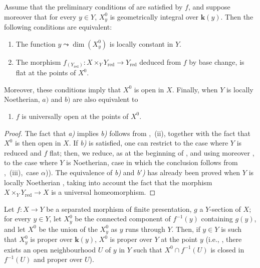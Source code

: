 \begin{corollary}[15.6.7]
\label{IV.15.6.7}
Assume that the preliminary conditions of  are satisfied by $f$, and suppose moreover that for every $y\in Y$, $X_y^0$ is geometrically integral over $\boldsymbol{k}(y)$.
Then the following conditions are equivalent:
\begin{enumerate}[label=\emph{\alph*)}]
  \item The function $y\leadsto\dim(X_y^0)$ is locally constant in $Y$.
  \item The morphism $f_{(Y_\mathrm{red})}:X\times_Y Y_\mathrm{red}\to Y_\mathrm{red}$ deduced from $f$ by base change, is flat at the points of $X^0$.
\end{enumerate}
Moreover, these conditions imply that $X^0$ is open in $X$.
Finally, when $Y$ is locally Noetherian, $a)$ and $b)$ are also equivalent to
\begin{enumerate}
  \item[\rm b$'$)] $f$ is universally open at the points of $X^0$.
\end{enumerate}
\end{corollary}

\begin{proof}
The fact that \emph{a)} implies \emph{b)} follows from ,~(ii), together with the fact that $X^0$ is then open in $X$.
If \emph{b)} is satisfied, one can restrict to the case where $Y$ is reduced and $f$ flat; then, we reduce, as at the beginning of , and using moreover , to the case where $Y$ is Noetherian, case in which the conclusion follows from ,~(iii),~case $\alpha$)).
The equivalence of \emph{b)} and \emph{b$'$)} has already been proved when $Y$ is locally Noetherian , taking into account the fact that the morphism $X\times_Y Y_\mathrm{red}\to X$ is a universal homeomorphism.
\end{proof}

\begin{proposition}[15.6.8]
\label{IV.15.6.8}
Let $f:X\to Y$ be a separated morphism of finite presentation, $g$ a $Y$-section of $X$; for every $y\in Y$, let $X_y^0$ be the connected component of $f^{-1}(y)$ containing $g(y)$, and let $X^0$ be the union of the $X_y^0$ as $y$ runs through $Y$.
Then, if $y\in Y$ is such that $X_y^0$ is proper over $\boldsymbol{k}(y)$, $X^0$ is proper over $Y$ at the point $y$ \textup{(i.e., , there exists an open neighbourhood $U$ of $y$ in $Y$ such that $X^0\cap f^{-1}(U)$ is closed in $f^{-1}(U)$ and proper over $U$)}.
\end{proposition}

